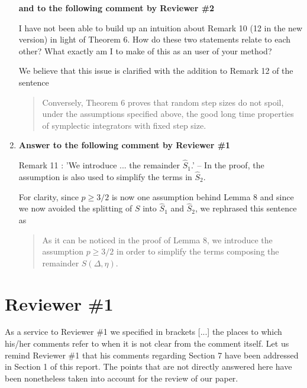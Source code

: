 \documentclass[10pt]{article}
\begin{document}
\begin{enumerate}
\begin{itquote}
	\end{itquote}
	\textbf{and to the following comment by Reviewer \#2}
	\begin{itquote}
		I have not been able to build up an intuition about Remark 10 {\normalfont (12 in the new version)} in light of Theorem 6. How do these two statements relate to each other? What exactly am I to make of this as an user of your method?
	\end{itquote}
	We believe that this issue is clarified with the addition to Remark 12 of the sentence 
	\begin{quote}
		Conversely, Theorem 6 proves that random step sizes do not spoil, under the assumptions specified above, the good long time properties of symplectic integrators with fixed step size.
	\end{quote}
	\item \textbf{Answer to the following comment by Reviewer \#1}
	\begin{itquote}
		Remark 11 {}: 'We introduce ... the remainder $\widehat{S}_1$.' -- In the proof, the assumption is also used to simplify the terms in $\widehat{S}_2$.
	\end{itquote}
	For clarity, since $p \geq 3/2$ is now one assumption behind Lemma 8 and since we now avoided the splitting of $S$ into $\hat S_1$ and $\hat S_2$, we rephrased this sentence as
	\begin{quote}
		 As it can be noticed in the proof of Lemma 8, we introduce the assumption $p \geq 3/2$ in order to simplify the terms composing the remainder $S(\Delta, \eta)$.
	\end{quote}
\end{enumerate}

\section{Reviewer \#1} 

As a service to Reviewer \#1 we specified in brackets [...] the places to which his/her comments refer to when it is not clear from the comment itself. Let us remind Reviewer \#1 that his comments regarding Section 7 have been addressed in Section 1 of this report. The points that are not directly answered here have been nonetheless taken into account for the review of our paper. 
\end{document}
